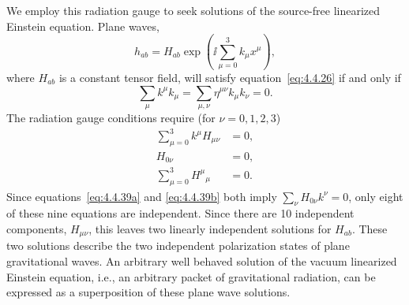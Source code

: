 We employ this radiation gauge to seek solutions of the source-free linearized
Einstein equation. Plane waves,
\begin{equation}
  h_{ab}=H_{ab}\exp\left(\ii\sum_{\mu=0}^{3}k_\mu x^\mu\right) ,
  \tag{4.4.37}\label{eq:4.4.37}
\end{equation}
where \(H_{ab}\) is a constant tensor field, will satisfy
equation~\eqref{eq:4.4.26} if and only if
\begin{equation}
  \sum_\mu k^\mu k_\mu
    =\sum_{\mu,\nu}\eta^{\mu\nu}k_\mu k_\nu=0 .
  \tag{4.4.38}\label{eq:4.4.38}
\end{equation}
The radiation gauge conditions require (for \(\nu=0,1,2,3\))
\begin{align}
  \sum_{\mu=0}^{3}k^\mu H_{\mu\nu}&=0 ,
    \tag{4.4.39a}\label{eq:4.4.39a}\\
  H_{0\nu}&=0 ,
    \tag{4.4.39b}\label{eq:4.4.39b}\\
  \sum_{\mu=0}^{3}H^\mu{}_\mu&=0 .
    \tag{4.4.39c}\label{eq:4.4.39c}
\end{align}
Since equations~\eqref{eq:4.4.39a} and \eqref{eq:4.4.39b} both imply
\(\sum_\nu H_{0\nu}k^\nu=0\), only eight of these nine equations are
independent. Since there are 10 independent components, \(H_{\mu\nu}\), this
leaves two linearly independent solutions for \(H_{ab}\). These two solutions
describe the two independent polarization states of plane gravitational waves. An
arbitrary well behaved solution of the vacuum linearized Einstein equation, i.e., an
arbitrary packet of gravitational radiation, can be expressed as a superposition of
these plane wave solutions.

